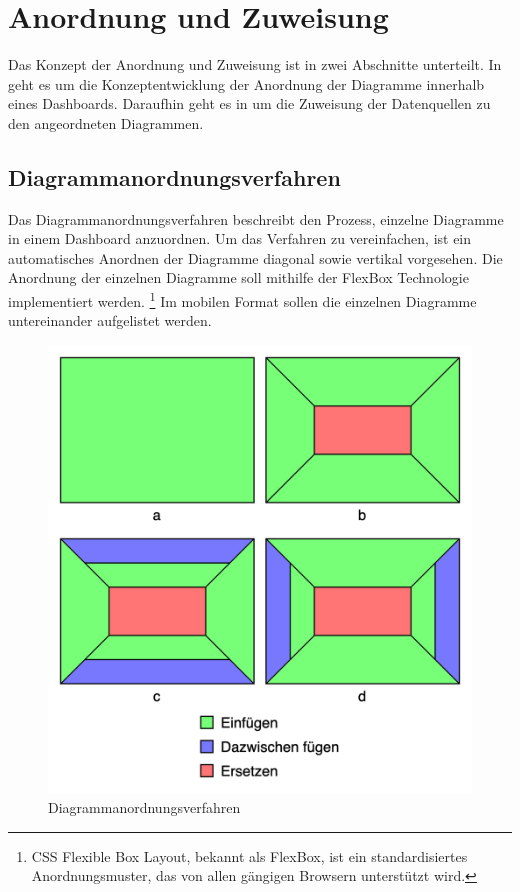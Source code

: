 \section{Anordnung und Zuweisung}
\label{sec:andordnungundzuweisung}
Das Konzept der Anordnung und Zuweisung ist in zwei Abschnitte unterteilt.
In  geht es um die Konzeptentwicklung
der Anordnung der Diagramme innerhalb eines Dashboards. Daraufhin geht
es in  um die Zuweisung der Datenquellen
zu den angeordneten Diagrammen.

\subsection{Diagrammanordnungsverfahren}
\label{subsec:diagrammanordnungsverfahren}
Das Diagrammanordnungsverfahren beschreibt den Prozess, einzelne Diagramme in einem Dashboard anzuordnen.
Um das Verfahren zu vereinfachen, ist ein automatisches Anordnen der Diagramme diagonal sowie vertikal vorgesehen.
Die Anordnung der einzelnen Diagramme soll mithilfe der FlexBox Technologie implementiert werden.
\footnote{CSS Flexible Box Layout, bekannt als FlexBox, ist ein standardisiertes Anordnungsmuster, das von allen gängigen Browsern unterstützt wird.\cite{CanIUseFlexBox}}
Im mobilen Format sollen die einzelnen Diagramme untereinander aufgelistet werden. 

\begin{figure}
    \begin{center}
    \includegraphics[scale=0.2]{img/abbildungen/DiagrammanordnungsverfahrenMitLegende}
    \end{center}
    \caption{Diagrammanordnungsverfahren}
    \label{figure:diagrammanaordnungsverfahren}
\end{figure}

